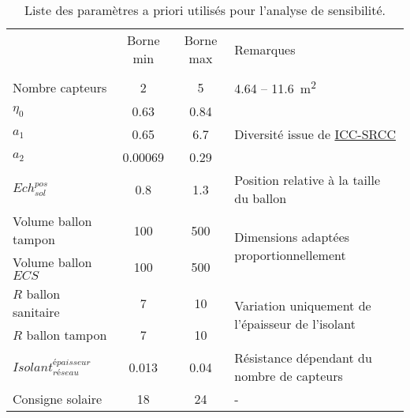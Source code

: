 \begin{table}
\centering
\caption{Liste des paramètres a priori utilisés pour l’analyse de sensibilité.}
\label{tab:facteur_sensibilite}
\begin{tabular}{l c c l}
  \toprule
  \addlinespace
                                               & Borne min     & Borne max   & Remarques                                                            \\
  \addlinespace
  \multicolumn{4}{l}{\bm{$SSC$}}                                                                           \\
  \midrule
  Nombre capteurs                              & \num{2}       & \num{5}     & \num{4.64} -- \SI{11.6}{\metre\squared}                              \\
  $\eta_{0}$                                   & \num{0.63}    & \num{0.84}  & \multirow{3}{*}{Diversité issue de \href{www.solar-rating.org}{ICC-SRCC}}   \\
  $a_{1}$                                      & \num{0.65}    & \num{6.7}   &                                                                      \\
  $a_{2}$                                      & \num{0.00069} & \num{0.29}  &                                                                      \\
  $Ech_{sol}^{pos}$                            & \num{0.8}     & \num{1.3}   & Position relative à la taille du ballon                              \\
  Volume ballon tampon                         & \num{100}     & \num{500}   & \multirow{2}{*}{Dimensions adaptées proportionnellement}             \\
  Volume ballon $ECS$                          & \num{100}     & \num{500}   &                                                                      \\
  $R$ ballon sanitaire                         & \num{7}       & \num{10}    & \multirow{2}{*}{Variation uniquement de l’épaisseur de l’isolant}    \\
  $R$ ballon tampon                            & \num{7}       & \num{10}    &                                                                      \\
  $Isolant_{réseau}^{épaisseur}$               & \num{0.013}   & \num{0.04}  & Résistance dépendant du nombre de capteurs                           \\
  Consigne solaire                             & \num{18}      & \num{24}    &  -                                                                   \\

\end{tabular}
\end{table}
